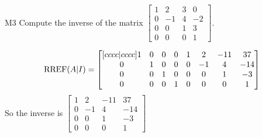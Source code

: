 \documentclass{sbgLAquiz}
\begin{document}
\begin{extract}\newpage\end{extract}
\begin{problem}{M3}
Compute the inverse of the matrix $\begin{bmatrix} 1 & 2 & 3 & 0 \\ 0 & -1 & 4 & -2 \\ 0 & 0 & 1 & 3 \\ 0 & 0 & 0 & 1 \end{bmatrix}$.
\end{problem}
\begin{solution}
$$\operatorname{RREF}(A|I) = \begin{bmatrix}[cccc|cccc] 1 & 0 & 0 &0 & 1 & 2 & -11 & 37 \\ 0 & 1 & 0 & 0 & 0 & -1 & 4 & -14 \\ 0 & 0 & 1 & 0 & 0 & 0 & 1 & -3 \\ 0 & 0 & 0 & 1 & 0 & 0 & 0 & 1 \end{bmatrix}$$
So the inverse is $\begin{bmatrix}  1 & 2 & -11 & 37 \\ 0 & -1 & 4 & -14 \\  0 & 0 & 1 & -3 \\ 0 & 0 & 0 & 1 \end{bmatrix}$
\end{solution}
\end{document}
